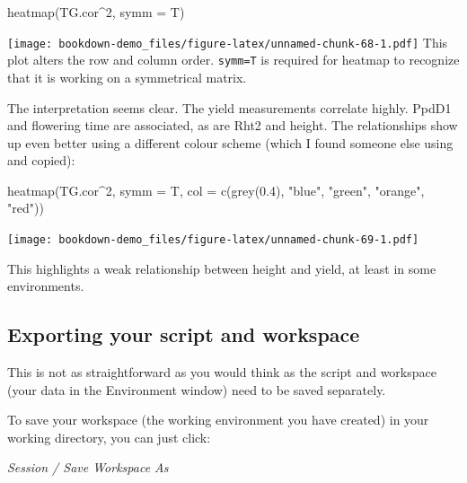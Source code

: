 \documentclass[
]{book}
\newenvironment{Shaded}{\begin{snugshade}}{\end{snugshade}}
\newcommand{\AttributeTok}[1]{\textcolor[rgb]{0.77,0.63,0.00}{#1}}
\newcommand{\DecValTok}[1]{\textcolor[rgb]{0.00,0.00,0.81}{#1}}
\newcommand{\FloatTok}[1]{\textcolor[rgb]{0.00,0.00,0.81}{#1}}
\newcommand{\FunctionTok}[1]{\textcolor[rgb]{0.00,0.00,0.00}{#1}}
\newcommand{\NormalTok}[1]{#1}
\newcommand{\SpecialCharTok}[1]{\textcolor[rgb]{0.00,0.00,0.00}{#1}}
\newcommand{\StringTok}[1]{\textcolor[rgb]{0.31,0.60,0.02}{#1}}
\begin{document}
\begin{Shaded}
\begin{Highlighting}[]
\FunctionTok{heatmap}\NormalTok{(TG.cor}\SpecialCharTok{\^{}}\DecValTok{2}\NormalTok{, }\AttributeTok{symm =}\NormalTok{ T)}
\end{Highlighting}
\end{Shaded}

\texttt{[image: bookdown-demo\_files/figure-latex/unnamed-chunk-68-1.pdf]}
This plot alters the row and column order. \texttt{symm=T} is required for heatmap to recognize that it is working on a symmetrical matrix.

The interpretation seems clear. The yield measurements correlate highly. PpdD1 and flowering time are associated, as are Rht2 and height. The relationships show up even better using a different colour scheme (which I found someone else using and copied):

\begin{Shaded}
\begin{Highlighting}[]
\FunctionTok{heatmap}\NormalTok{(TG.cor}\SpecialCharTok{\^{}}\DecValTok{2}\NormalTok{, }\AttributeTok{symm =}\NormalTok{ T, }\AttributeTok{col =} \FunctionTok{c}\NormalTok{(}\FunctionTok{grey}\NormalTok{(}\FloatTok{0.4}\NormalTok{), }\StringTok{"blue"}\NormalTok{, }\StringTok{"green"}\NormalTok{, }
    \StringTok{"orange"}\NormalTok{, }\StringTok{"red"}\NormalTok{))}
\end{Highlighting}
\end{Shaded}

\texttt{[image: bookdown-demo\_files/figure-latex/unnamed-chunk-69-1.pdf]}

This highlights a weak relationship between height and yield, at least in some environments.

\hypertarget{exporting-your-script-and-workspace}{%
\subsection{Exporting your script and workspace}\label{exporting-your-script-and-workspace}}

This is not as straightforward as you would think as the script and workspace (your data in the Environment window) need to be saved separately.

To save your workspace (the working environment you have created) in your working directory, you can just click:

\emph{Session / Save Workspace As}
\end{document}
